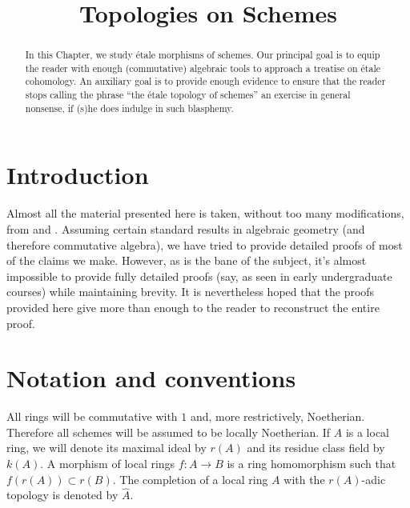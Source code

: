 

%


\title{Topologies on Schemes}

\begin{abstract}
In this Chapter, we study \'etale morphisms of schemes. Our principal goal is
to equip the reader with enough (commutative) algebraic tools to approach a
treatise on \'etale cohomology. An auxiliary goal is to provide enough evidence
to ensure that the reader stops calling the phrase ``the \'etale topology of
schemes'' an exercise in general nonsense, if (s)he does indulge in such
blasphemy. 
\end{abstract}

\maketitle

\tableofcontents

\section{Introduction}
\label{section-introduction}

\noindent
Almost all the material presented here is taken, without too many
modifications, from \cite{SGA1} and \cite{Ner}. Assuming certain standard
results in algebraic geometry (and therefore commutative algebra), we have
tried to provide detailed proofs of most of the claims we make. However, as is
the bane of the subject, it's almost impossible to provide fully detailed
proofs (say, as seen in early undergraduate courses) while maintaining
brevity. It is nevertheless hoped that the proofs provided here give more than
enough to the reader to reconstruct the entire proof.

\section{Notation and conventions}
\label{section-notation}

\noindent
All rings will be commutative with $1$ and, more restrictively, Noetherian.
Therefore all schemes will be assumed to be locally Noetherian. If $A$ is a
local ring, we will denote its maximal ideal by $r(A)$ and its residue class
field by $k(A)$. A morphism of local rings $f:A \to B$ is a ring homomorphism
such that $f(r(A)) \subset r(B)$. The completion of a local ring $A$ with the
$r(A)$-adic topology is denoted by $\widehat{A}$.


